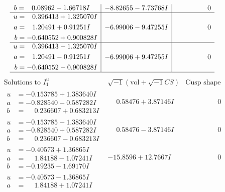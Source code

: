 \documentclass[1p]{elsarticle_modified}
\theoremstyle{definition}
\newcommand{\I}{\sqrt{-1}}
\begin{document}
$$\begin{array}{c|c|c}
\begin{aligned}
b &= \phantom{-}0.08962 - 1.66718 I\end{aligned}
 & -8.82655 - 7.73768 I & \phantom{-0.000000 } 0 \\ \hline\begin{aligned}
u &= \phantom{-}0.396413 + 1.325070 I \\
a &= \phantom{-}1.20491 + 0.91251 I \\
b &= -0.640552 + 0.900828 I\end{aligned}
 & -6.99006 - 9.47255 I & \phantom{-0.000000 } 0 \\ \hline\begin{aligned}
u &= \phantom{-}0.396413 - 1.325070 I \\
a &= \phantom{-}1.20491 - 0.91251 I \\
b &= -0.640552 - 0.900828 I\end{aligned}
 & -6.99006 + 9.47255 I & \phantom{-0.000000 } 0\\
 \hline 
 \end{array}$$\newpage$$\begin{array}{c|c|c}  
\text{Solutions to }I^u_{1}& \I (\text{vol} + \sqrt{-1}CS) & \text{Cusp shape}\\
 \hline 
\begin{aligned}
u &= -0.153785 + 1.383640 I \\
a &= -0.828540 - 0.587282 I \\
b &= \phantom{-}0.236607 + 0.683213 I\end{aligned}
 & \phantom{-}0.58476 + 3.87146 I & \phantom{-0.000000 } 0 \\ \hline\begin{aligned}
u &= -0.153785 - 1.383640 I \\
a &= -0.828540 + 0.587282 I \\
b &= \phantom{-}0.236607 - 0.683213 I\end{aligned}
 & \phantom{-}0.58476 - 3.87146 I & \phantom{-0.000000 } 0 \\ \hline\begin{aligned}
u &= -0.40573 + 1.36865 I \\
a &= \phantom{-}1.84188 - 1.07241 I \\
b &= -0.19235 - 1.69170 I\end{aligned}
 & -15.8596 + 12.7667 I & \phantom{-0.000000 } 0 \\ \hline\begin{aligned}
u &= -0.40573 - 1.36865 I \\
a &= \phantom{-}1.84188 + 1.07241 I \\

\end{aligned}
\end{array}$$
\end{document}
